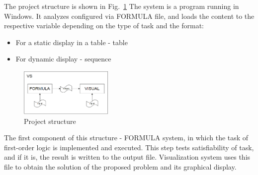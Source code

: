 \documentclass[a4paper, 10pt, conference]{ieeeconf}
\begin{document}
The project structure is shown in Fig.~\ref{fig:structure}
The system is a program running in Windows. It analyzes configured via FORMULA file, and loads the content to the respective variable depending on the type of task and the format:
\begin{itemize}
\item For a static display in a table - table
\item For dynamic display - sequence
\end{itemize}
\begin{figure}[h]
    \centering
    \includegraphics[width=0.4\textwidth]{structure.png}
    \caption{Project structure}
    \label{fig:structure}
\end{figure}
The first component of this structure - FORMULA system, in which the task of first-order logic is implemented and executed. This step tests satisfiability of task, and if it is, the result is written to the output file. Visualization system uses this file to obtain the solution of the proposed problem and its graphical display.\\
\end{document}
